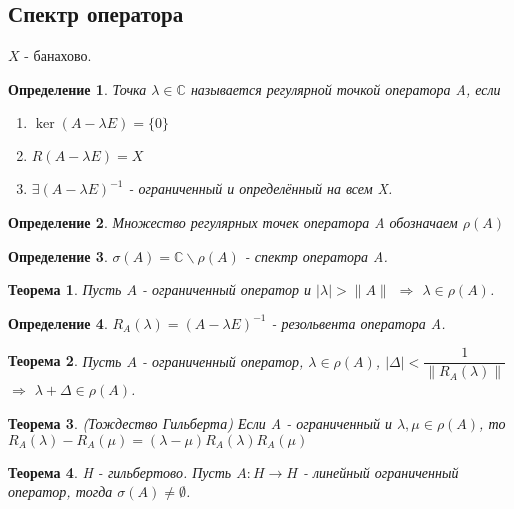 \documentclass[9pt, a4paper]{extarticle}
\newtheorem{theorem}{Теорема}
\newtheorem{definition}{Определение}
\numberwithin{equation}{section}
\numberwithin{lemma}{section}
\numberwithin{definition}{section}
\numberwithin{notabene}{section}
\numberwithin{corollary}{section}
\begin{document}
\subsection{Спектр оператора}
$X$ - банахово.
	\begin{definition}
		Точка $\lambda \in \mathbb{C}$ называется регулярной точкой оператора A, если 
		\begin{enumerate}
			\item $\ker{(A - \lambda E)} = \{0\}$
			\item $R(A - \lambda E) = X$
			\item $\exists (A - \lambda E)^{-1}$ - ограниченный и определённый на всем X. 
		\end{enumerate}
	\end{definition}
	\begin{definition}
		Множество регулярных точек оператора A обозначаем $\rho(A)$
	\end{definition}
	\begin{definition}
		$\sigma(A) = \mathbb{C} \backslash \rho(A)$  - спектр оператора A. 
	\end{definition}
	\begin{theorem}
		Пусть $A$ - ограниченный оператор и $|\lambda| > \|A\|$ $\Rightarrow$  $\lambda \in \rho(A)$. 
	\end{theorem}
	\begin{definition}
		$R_A(\lambda) = (A - \lambda E) ^{-1}$ - резольвента оператора A. 
	\end{definition}
	\begin{theorem}
		Пусть $A$ - ограниченный оператор, $\lambda \in \rho(A)$, $|\Delta| < \dfrac{1}{\|R_A(\lambda)\|}$ $\Rightarrow$ $\lambda + \Delta \in \rho(A)$.  
	\end{theorem}
	\begin{theorem}
		(Тождество Гильберта)\newline
		Если A - ограниченный и $\lambda, \mu \in \rho(A)$, то 
		$R_A(\lambda) - R_A(\mu) = (\lambda - \mu) R_A(\lambda) R_A(\mu)$
	\end{theorem}
	\begin{theorem}
		H - гильбертово. Пусть $A: H \to H$ - линейный ограниченный оператор, тогда $\sigma(A) \neq \emptyset$.		
	\end{theorem}
\end{document}
